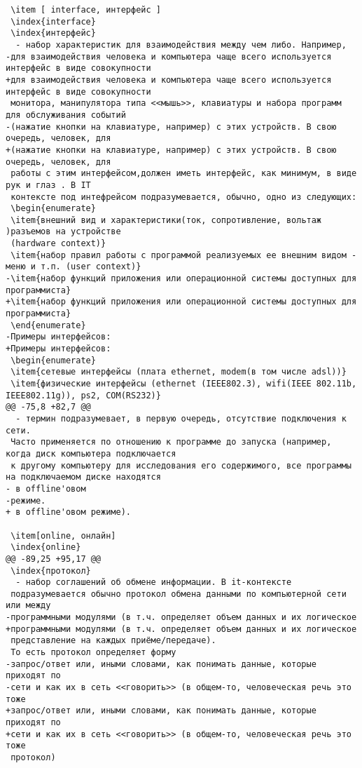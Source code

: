 \begin{verbatim}
 \item [ interface, интерфейс ]
 \index{interface}
 \index{интерфейс}
  - набор характеристик для взаимодействия между чем либо. Например,
-для взаимодействия человека и компьютера чаще всего используется интерфейс в виде совокупности
+для взаимодействия человека и компьютера чаще всего используется интерфейс в виде совокупности
 монитора, манипулятора типа <<мышь>>, клавиатуры и набора программ для обслуживания событий
-(нажатие кнопки на клавиатуре, например) с этих устройств. В свою очередь, человек, для
+(нажатие кнопки на клавиатуре, например) с этих устройств. В свою очередь, человек, для
 работы с этим интерфейсом,должен иметь интерфейс, как минимум, в виде рук и глаз . В IT
 контексте под интефрейсом подразумевается, обычно, одно из следующих:
 \begin{enumerate}
 \item{внешний вид и характеристики(ток, сопротивление, вольтаж )разъемов на устройстве
 (hardware context)}
 \item{набор правил работы с программой реализуемых ее внешним видом - меню и т.п. (user context)}
-\item{набор функций приложения или операционной системы доступных для программиста}
+\item{набор функций приложения или операционной системы доступных для программиста}
 \end{enumerate}
-Примеры интерфейсов:
+Примеры интерфейсов:
 \begin{enumerate}
 \item{сетевые интерфейсы (плата ethernet, modem(в том числе adsl))}
 \item{физические интерфейсы (ethernet (IEEE802.3), wifi(IEEE 802.11b, IEEE802.11g)), ps2, COM(RS232)}
@@ -75,8 +82,7 @@
  - термин подразумевает, в первую очередь, отсутствие подключения к сети.
 Часто применяется по отношению к программе до запуска (например, когда диск компьютера подключается
 к другому компьютеру для исследования его содержимого, все программы на подключаемом диске находятся
- в offline'овом
-режиме.
+ в offline'овом режиме).

 \item[online, онлайн]
 \index{online}
@@ -89,25 +95,17 @@
 \index{протокол}
  - набор соглашений об обмене информации. В it-контексте
 подразумевается обычно протокол обмена данными по компьютерной сети или между
-программными модулями (в т.ч. определяет объем данных и их логическое
+программными модулями (в т.ч. определяет объем данных и их логическое
 представление на каждых приёме/передаче).
 То есть протокол определяет форму
-запрос/ответ или, иными словами, как понимать данные, которые приходят по
-сети и как их в сеть <<говорить>> (в общем-то, человеческая речь это тоже
+запрос/ответ или, иными словами, как понимать данные, которые приходят по
+сети и как их в сеть <<говорить>> (в общем-то, человеческая речь это тоже
 протокол)


\end{verbatim}
